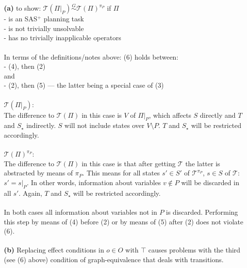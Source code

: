 \documentclass[11pt,a4paper]{article}
\begin{document}
\textbf{(a)} to show: $\mathscr{T}(\Pi|_P)\stackrel{G}{\sim}\mathscr{T}(\Pi)^{\pi_P}$ if $\Pi$\\
\hphantom{tabtab}- is an SAS$^+$ planning task\\
\hphantom{tabtab}- is not trivially unsolvable\\
\hphantom{tabtab}- has no trivially inapplicable operators\\
\\
In terms of the definitions/notes above: (6) holds between:\\
\hphantom{tabtab}- (4), then (2)\\
\hphantom{tabtab}and\\
\hphantom{tabtab}- (2), then (5) --- the latter being a special case of (3)\\
\\
$\mathscr{T}(\Pi|_P)$:\\
The difference to $\mathscr{T}(\Pi)$ in this case is $V$ of $\Pi|_P$, which affects $S$ directly and $T$ and $S_\star$ indirectly. $S$ will not include states over $V\setminus P$. $T$ and $S_\star$ will be restricted accordingly.\\
\\
$\mathscr{T}(\Pi)^{\pi_P}$:\\
The difference to $\mathscr{T}(\Pi)$ in this case is that after getting $\mathscr{T}$ the latter is abstracted by means of $\pi_P$. This means for all states $s'\in S'$ of $\mathscr{T}^{\pi_P}$, $s\in S$ of $\mathscr{T}$: $s'=s|_P$. In other words, information about variables $v\notin P$ will be discarded in all $s'$. Again, $T$ and $S_\star$ will be restricted accordingly.\\
\\
In both cases all information about variables not in $P$ is discarded. Performing this step by means of (4) before (2) or by means of (5) after (2) does not violate (6).\\
\\
\textbf{(b)} Replacing effect conditions in $o\in O$ with $\top$ causes problems with the third (see (6) above) condition of graph-equivalence that deals with transitions.

\label{lastpage}
\end{document}
